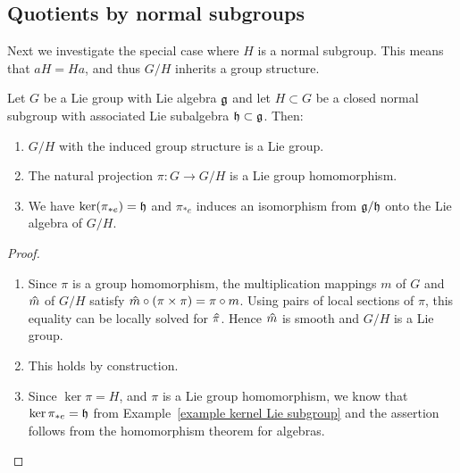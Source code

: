 











\subsection{Quotients by normal subgroups}

Next we investigate the special case where $H$ is a normal subgroup. This means that $aH=Ha$, and thus $G\slash H$ inherits a group structure. 

\begin{prop}\label{prop quotient group}
    Let $G$ be a Lie group with Lie algebra $\mathfrak{g}$ and let $H\subset G$ be a closed normal subgroup with associated Lie subalgebra $\mathfrak{h}\subset \mathfrak{g}$. Then:
    \begin{enumerate}
        \item $G\slash H$ with the induced group structure is a Lie group.
        \item The natural projection $\pi: G\to G\slash H$ is a Lie group homomorphism.
        \item We have $\ker(\pi_{\ast e})=\mathfrak{h}$ and $\pi_{\ast e}$ induces an isomorphism from $\mathfrak{g}\slash \mathfrak{h}$ onto the Lie algebra of $G\slash H$.
    \end{enumerate}
\end{prop}
\begin{proof}
    \begin{enumerate}
        \item Since $\pi$ is a group homomorphism, the multiplication mappings $m$ of $G$ and $\wh{m}$ of $G\slash H$ satisfy $\wh{m}\circ(\pi\times \pi)=\pi\circ m$. Using pairs of local sections of $\pi$, this equality can be locally solved for $\wh{\pi}$. Hence $\wh{m}$ is smooth and $G\slash H$ is a Lie group.
        \item This holds by construction.
        \item Since $\ker \pi=H$, and $\pi$ is a Lie group homomorphism, we know that $\ker \pi_{\ast e}=\mathfrak{h}$ from Example~\ref{example kernel Lie subgroup} and the assertion follows from the homomorphism theorem for algebras.
    \end{enumerate}
\end{proof}

